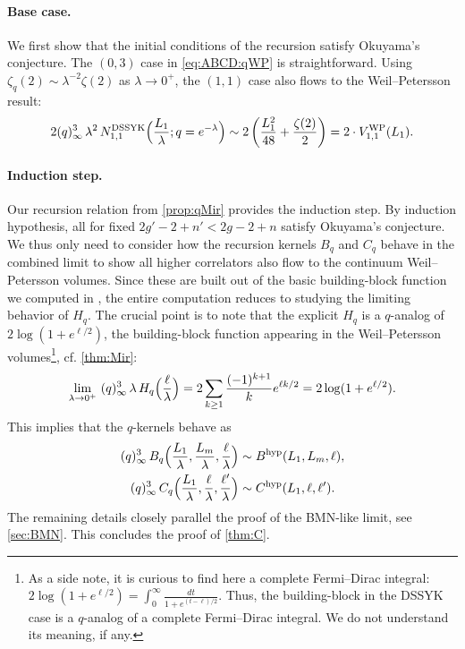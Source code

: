 \documentclass[a4paper,11pt,english]{article}
\theoremstyle{plain}
\theoremstyle{definition}
\theoremstyle{plain}
\begin{document}
\paragraph{Base case.}
We first show that the initial conditions of the recursion satisfy Okuyama's conjecture. The $(0,3)$ case in \cref{eq:ABCD:qWP} is straightforward. Using $\zeta_{q}(2) \sim \lambda^{-2} \zeta(2)$ as $\lambda \to 0^+$, the $(1,1)$ case also flows to the Weil--Petersson result: 
\begin{equation}
	2(q)_{\infty}^3 \, \lambda^2 \,
    N_{1,1}^{\textup{DSSYK}}\Bigl(\frac{L_1}{\lambda};q=e^{-\lambda}\Bigr)
	\sim
	2 \left( \frac{L_1^2}{48} + \frac{\zeta(2)}{2} \right)
	=
	2 \cdot V_{1,1}^{\textup{WP}}(L_1) .
\end{equation}

\paragraph{Induction step.}
Our recursion relation from \cref{prop:qMir} provides the induction step. By induction hypothesis, all  for fixed $2g'-2+n'<2g-2+n$ satisfy Okuyama's conjecture. We thus only need to consider how the recursion kernels $B_q$ and $C_q$ behave in the combined limit to show all higher correlators  also flow to the continuum Weil--Petersson volumes. Since these are built out of the basic building-block function we computed in , the entire computation reduces to studying the limiting behavior of $H_q$. The crucial point is to note that the explicit $H_q$ is a $q$-analog of $2 \log(1 + e^{\ell/2})$, the building-block function appearing in the Weil--Petersson volumes\footnote{
    As a side note, it is curious to find here a complete Fermi--Dirac integral: $2 \log(1 + e^{\ell/2}) = \int_{0}^{\infty} \frac{dt}{1 + e^{(t-\ell)/2}}$. Thus, the building-block in the DSSYK case is a $q$-analog of a complete Fermi--Dirac integral. We do not understand its meaning, if any.}, cf. \cref{thm:Mir}:
\begin{equation}
	\lim_{\lambda \to 0^+} \
        (q)_{\infty}^3 \, \lambda \,
        H_q\Bigl( \frac{\ell}{\lambda} \Bigr)
	=
	2 \sum_{k \ge 1} \frac{(-1)^{k+1}}{k} e^{\ell k/2}
	=
	2 \log(1 + e^{\ell/2}).
\end{equation}
This implies that the $q$-kernels behave as  
\begin{equation}
\begin{aligned}
	(q)_{\infty}^3 \, B_q\Bigl(
        \frac{L_1}{\lambda},\frac{L_m}{\lambda},\frac{\ell}{\lambda}
    \Bigr)
	&\sim
	B^{\textup{hyp}}(L_1,L_m,\ell), \\
	(q)_{\infty}^3 \, C_q\Bigl(
        \frac{L_1}{\lambda},\frac{\ell}{\lambda},\frac{\ell'}{\lambda}
    \Bigr)
	&\sim
	C^{\textup{hyp}}(L_1,\ell,\ell').
\end{aligned}
\end{equation}
The remaining details closely parallel the proof of the BMN-like limit, see \cref{sec:BMN}. This concludes the proof of \cref{thm:C}.
\end{document}
